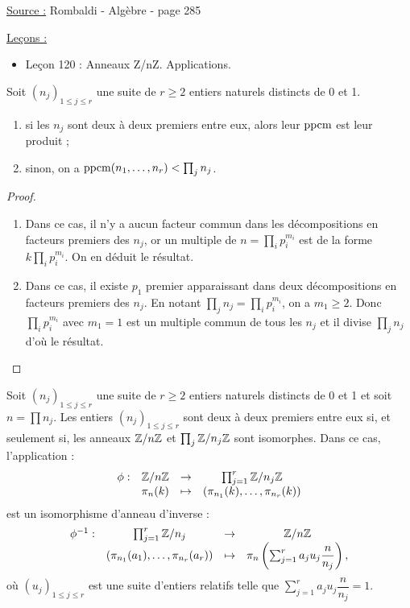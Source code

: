 
\newcommand{\Znz}{\Z/n\Z}
\newcommand{\Znzx}{\Z/n\Z^{\times}}

\pagestyle{fancy}

\fancyhead[C]{}
\fancyhead[R]{}



\underline{Source :} Rombaldi - Algèbre - page 285

\underline{Leçons :}
\begin{itemize}
\item Leçon 120 : Anneaux Z/nZ. Applications. 
\end{itemize}

\begin{lem}
\label{lem:1}
Soit $(n_j)_{1 \leq j \leq r}$ une suite de $r \geq 2$ entiers naturels distincts de 0 et 1.
\begin{enumerate}
\item si les $n_j$ sont deux à deux premiers entre eux, alors leur $\operatorname{ppcm}$ est leur produit ;
\item sinon, on a $\operatorname{ppcm}(n_1, \dots, n_r) < \prod_j n_j$.
\end{enumerate}
\end{lem}

\begin{proof}
\begin{enumerate}
\item Dans ce cas, il n'y a aucun facteur commun dans les décompositions en facteurs premiers des $n_j$,
or un multiple de $n = \prod_i p_i^{m_i}$ est de la forme $k \prod_i p_i^{m_i}$. On en déduit le résultat.
\item Dans ce cas, il existe $p_1$ premier apparaissant dans deux décompositions en facteurs premiers des $n_j$.
En notant $\prod_j n_j=\prod_i p_i^{m_i}$, on a $m_1 \geq 2$. 
Donc $\prod_i p_i^{m_i}$ avec $m_1=1$ est un multiple commun de tous les $n_j$ et il divise $\prod_j n_j$ d'où le résultat.
\end{enumerate}
\end{proof}

\begin{thm}
Soit $(n_j)_{1 \leq j \leq r}$ une suite de $r \geq 2$ entiers naturels distincts de 0 et 1 et soit $n = \prod n_j$.
Les entiers $(n_j)_{1 \leq j \leq r}$ sont deux à deux premiers entre eux si, et seulement si, les anneaux $\Znz$ et 
$\prod_j \mathbb{Z}/n_j\mathbb{Z}$ sont isomorphes.
Dans ce cas, l'application :
\[ \begin{array}{c c c c}
\phi : & \Znz & \to & \prod_{j=1}^r \Z/n_j\Z \\
& \pi_n(k) & \mapsto & (\pi_{n_1}(k), \dots, \pi_{n_r}(k))
\end{array} \]
est un isomorphisme d'anneau d'inverse :
\[ \begin{array}{c c c c}
\phi^{-1} : &  \prod_{j=1}^r \Z/n_j & \to & \Znz \\
& (\pi_{n_1}(a_1), \dots, \pi_{n_r}(a_r)) & \mapsto & \pi_n \left ( \sum_{j=1}^r a_j u_j \dfrac{n}{n_j} \right ) ,
\end{array} \]
où $(u_j)_{1 \leq j \leq r}$ est une suite d'entiers relatifs telle que $\sum_{j=1}^r a_j u_j \dfrac{n}{n_j} = 1$.
\end{thm}

